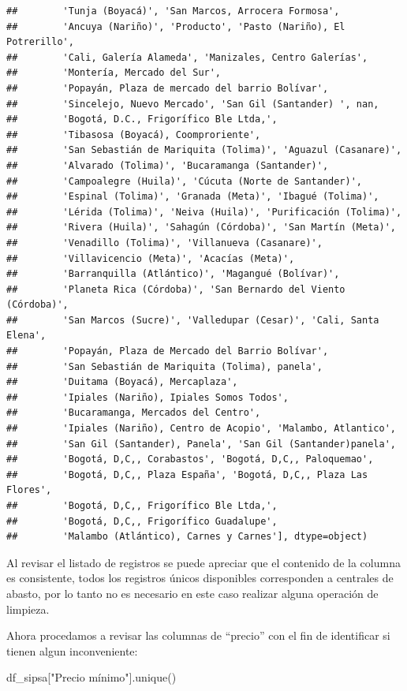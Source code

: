 \documentclass[
]{book}
\newenvironment{Shaded}{\begin{snugshade}}{\end{snugshade}}
\newcommand{\NormalTok}[1]{#1}
\newcommand{\StringTok}[1]{\textcolor[rgb]{0.31,0.60,0.02}{#1}}
\begin{document}
\begin{verbatim}
##        'Tunja (Boyacá)', 'San Marcos, Arrocera Formosa',
##        'Ancuya (Nariño)', 'Producto', 'Pasto (Nariño), El Potrerillo',
##        'Cali, Galería Alameda', 'Manizales, Centro Galerías',
##        'Montería, Mercado del Sur',
##        'Popayán, Plaza de mercado del barrio Bolívar',
##        'Sincelejo, Nuevo Mercado', 'San Gil (Santander) ', nan,
##        'Bogotá, D.C., Frigorífico Ble Ltda,',
##        'Tibasosa (Boyacá), Coomproriente',
##        'San Sebastián de Mariquita (Tolima)', 'Aguazul (Casanare)',
##        'Alvarado (Tolima)', 'Bucaramanga (Santander)',
##        'Campoalegre (Huila)', 'Cúcuta (Norte de Santander)',
##        'Espinal (Tolima)', 'Granada (Meta)', 'Ibagué (Tolima)',
##        'Lérida (Tolima)', 'Neiva (Huila)', 'Purificación (Tolima)',
##        'Rivera (Huila)', 'Sahagún (Córdoba)', 'San Martín (Meta)',
##        'Venadillo (Tolima)', 'Villanueva (Casanare)',
##        'Villavicencio (Meta)', 'Acacías (Meta)',
##        'Barranquilla (Atlántico)', 'Magangué (Bolívar)',
##        'Planeta Rica (Córdoba)', 'San Bernardo del Viento (Córdoba)',
##        'San Marcos (Sucre)', 'Valledupar (Cesar)', 'Cali, Santa Elena',
##        'Popayán, Plaza de Mercado del Barrio Bolívar',
##        'San Sebastián de Mariquita (Tolima), panela',
##        'Duitama (Boyacá), Mercaplaza',
##        'Ipiales (Nariño), Ipiales Somos Todos',
##        'Bucaramanga, Mercados del Centro',
##        'Ipiales (Nariño), Centro de Acopio', 'Malambo, Atlantico',
##        'San Gil (Santander), Panela', 'San Gil (Santander)panela',
##        'Bogotá, D,C,, Corabastos', 'Bogotá, D,C,, Paloquemao',
##        'Bogotá, D,C,, Plaza España', 'Bogotá, D,C,, Plaza Las Flores',
##        'Bogotá, D,C,, Frigorífico Ble Ltda,',
##        'Bogotá, D,C,, Frigorífico Guadalupe',
##        'Malambo (Atlántico), Carnes y Carnes'], dtype=object)
\end{verbatim}

Al revisar el listado de registros se puede apreciar que el contenido de la columna es consistente, todos los registros únicos disponibles corresponden a centrales de abasto, por lo tanto no es necesario en este caso realizar alguna operación de limpieza.

Ahora procedamos a revisar las columnas de ``precio'' con el fin de identificar si tienen algun inconveniente:

\begin{Shaded}
\begin{Highlighting}[]

\NormalTok{df\_sipsa[}\StringTok{"Precio mínimo"}\NormalTok{].unique()}
\end{Highlighting}
\end{Shaded}
\end{document}
